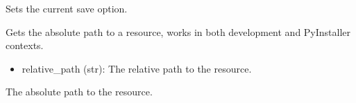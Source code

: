 \documentclass[a4paper,10pt,english]{sphinxmanual}
\begin{document}
\begin{fulllineitems}
\begin{fulllineitems}
\end{fulllineitems}


\begin{fulllineitems}
\label{\detokenize{src:src.mainwindow.Settings.set_save_option}}
\pysigstartsignatures
{}
\pysigstopsignatures
\sphinxAtStartPar
Sets the current save option.

\end{fulllineitems}


\begin{fulllineitems}
\label{\detokenize{src:src.mainwindow.Settings.settings_changed}}
\pysigstartsignatures
{}
\pysigstopsignatures
\end{fulllineitems}


\end{fulllineitems}


\begin{fulllineitems}
\label{\detokenize{src:src.mainwindow.resource_path}}
\pysigstartsignatures
{}
\pysigstopsignatures
\sphinxAtStartPar
Gets the absolute path to a resource, works in both development and PyInstaller contexts.
\begin{description}
\begin{itemize}
\item {} 
\sphinxAtStartPar
relative\_path (str): The relative path to the resource.

\end{itemize}

\sphinxAtStartPar
The absolute path to the resource.

\end{description}

\end{fulllineitems}
\end{document}
